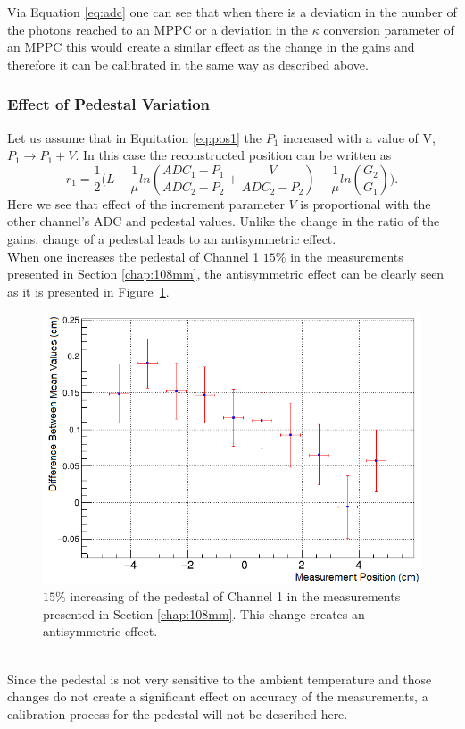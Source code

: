\documentclass[a4paper]{article}\linespread{1.4}
\begin{document}
Via Equation \ref{eq:adc} one can see that when there is a deviation in the number of the photons reached to an MPPC or a deviation in the $\kappa$ conversion parameter of an MPPC this would create a similar effect as the change in the gains and therefore it can be calibrated in the same way as described above.

\subsubsection{Effect of Pedestal Variation}
Let us assume that in Equitation \ref{eq:pos1} the $P_{1}$ increased with a value of V, $P_{1}\to P_{1}+V$. 
In this case the reconstructed position can be written as
\begin{equation} \label{eq:pos2} r_{1}=\frac{1}{2} \Big(L - \frac{1}{\mu} ln(\frac{ADC_{1} - P_{1} }{ADC_{2} - P_{2}}+\frac{ V }{ADC_{2} - P_{2}}) - \frac{1}{\mu} ln(\frac{G_{2}}{G_{1}})\Big) . \end{equation}
Here we see that effect of the increment parameter $V$ is proportional with the other channel's ADC and pedestal values. Unlike the change in the ratio of the gains, change of a pedestal leads to an antisymmetric effect.
\\When one increases the pedestal of Channel 1 $15\%$ in the measurements presented in Section \ref{chap:108mm}, the antisymmetric effect can be clearly seen as it is presented in Figure~\ref{fig:pedc}.
\begin{figure}[h!] \hspace*{-1cm} \includegraphics[width=130mm,scale=2.0]{pedc.png} \caption{$15\%$ increasing of  the pedestal of Channel 1 in the measurements presented in Section \ref{chap:108mm}. This change creates an antisymmetric effect.}  \label{fig:pedc}\end{figure}
\\Since the pedestal is not very sensitive to the ambient temperature and those changes do not create a significant effect on accuracy of the measurements, 
a calibration process for the pedestal will not be described here.
\end{document}
